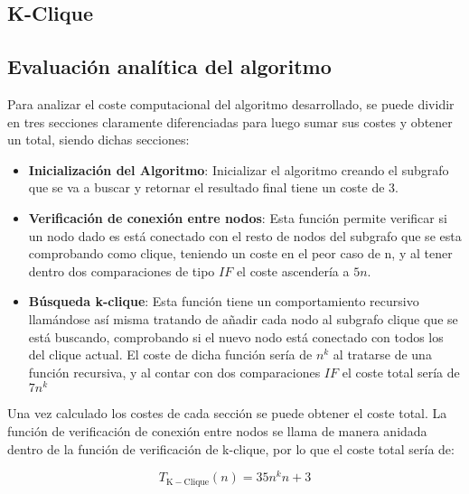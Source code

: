 


\subsection{K-Clique}\label{subsec:k-clique}


\subsection*{Evaluación analítica del algoritmo}

Para analizar el coste computacional del algoritmo desarrollado, se puede dividir en tres secciones claramente diferenciadas para luego sumar sus costes y obtener un total, siendo dichas secciones: 

\begin{itemize}
    
    \item \textbf{Inicialización del Algoritmo}: Inicializar el algoritmo creando el subgrafo que se va a buscar y retornar el resultado final tiene un coste de 3.

    \item \textbf{Verificación de conexión entre nodos}: Esta función permite verificar si un nodo dado es está conectado con el resto de nodos del subgrafo que se esta comprobando como clique, teniendo un coste en el peor caso de n, y al tener dentro dos comparaciones de tipo $IF$ el coste ascendería a $5n$.

    \item \textbf{Búsqueda k-clique}: Esta función tiene un comportamiento recursivo llamándose así misma tratando de añadir cada nodo al subgrafo clique que se está buscando, comprobando si el nuevo nodo está conectado con todos los del clique actual.
    El coste de dicha función sería de $n^k$ al tratarse de una función recursiva, y al contar con dos comparaciones $IF$ el coste total sería de $7n^k$


\end{itemize}

Una vez calculado los costes de cada sección se puede obtener el coste total. La función de verificación de conexión entre nodos se llama de  manera anidada dentro de la función de verificación de k-clique, por lo que el coste total sería de:

\begin{equation}
    T_{\mathrm{K-Clique}}(n) = 35n^k n +3
\end{equation}

